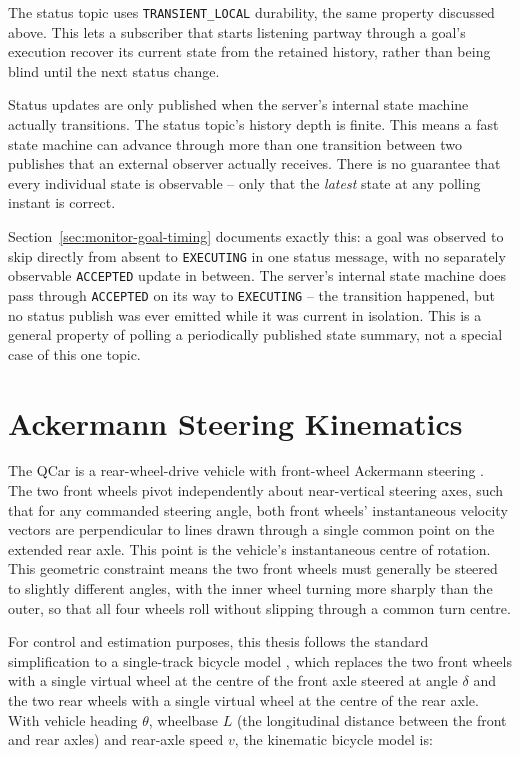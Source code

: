 The status topic uses \texttt{TRANSIENT\_LOCAL} durability, the same
property discussed above. This lets a subscriber that starts
listening partway through a goal's execution recover its current
state from the retained history, rather than being blind until the
next status change.

Status updates are only published when the server's internal state
machine actually transitions. The status topic's history depth
is finite. This means a fast state machine can advance through more
than one transition between two publishes that an external observer
actually receives. There is no guarantee that every individual state
is observable -- only that the \emph{latest} state at any polling
instant is correct.

Section~\ref{sec:monitor-goal-timing} documents exactly this: a goal
was observed to skip directly from absent to \texttt{EXECUTING} in
one status message, with no separately observable \texttt{ACCEPTED}
update in between. The server's internal state machine does pass
through \texttt{ACCEPTED} on its way to \texttt{EXECUTING} -- the
transition happened, but no status publish was ever emitted while it
was current in isolation. This is a general property of polling a
periodically published state summary, not a special case of this one
topic.

\section{Ackermann Steering Kinematics}
\label{sec:ackermann-kinematics}

The QCar is a rear-wheel-drive vehicle with front-wheel Ackermann
steering \cite{snider2009pathtracking}. The two front wheels pivot
independently about near-vertical steering axes, such that for any
commanded steering angle, both front wheels' instantaneous velocity
vectors are perpendicular to lines drawn through a single common
point on the extended rear axle. This point is the vehicle's
instantaneous centre of rotation. This geometric constraint means the
two front wheels must generally be steered to slightly different
angles, with the inner wheel turning more sharply than the outer, so
that all four wheels roll without slipping through a common turn
centre.

For control and estimation purposes, this thesis follows the
standard simplification to a single-track bicycle model
\cite{snider2009pathtracking}, which replaces the two front wheels with
a single virtual wheel at the centre of the front axle steered at
angle $\delta$ and the two rear wheels with a single virtual wheel
at the centre of the rear axle. With vehicle heading $\theta$,
wheelbase $L$ (the longitudinal distance between the front and rear
axles) and rear-axle speed $v$, the kinematic bicycle model is:

